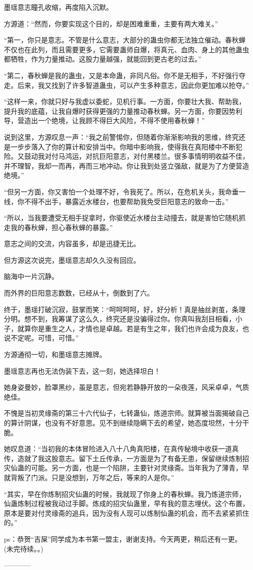 \begin{this_body}
墨瑶意志瞳孔收缩，再度陷入沉默。

方源道：“然而，你要实现这个目的，却是困难重重，主要有两大难关。”

“第一，你只是意志。不管是什么意志，大部分的蛊虫你都无法独立催动。春秋蝉不仅也在此列，而且需要更多，它需要蛊师自爆，将真元、血肉、身上的其他蛊虫都牺牲，作为力量推动。这股力量越强，就能回到更古老的过去。”

“第二，春秋蝉是我的蛊虫，又是本命蛊，非同凡俗。你不是无相手，不好强行夺走。后来，我又找到了许多智道蛊虫，可以产生多种意志，因此你更加难以抢夺。”

“这样一来，你就只好与我虚以委蛇，见机行事。一方面，你要壮大我、帮助我，提升我的底蕴，让我自爆时获得更强的力量推动春秋蝉。另一方面，你要因势利导，营造出一个绝境，让我顾不得巨大风险，不得不使用春秋蝉！”

说到这里，方源叹息一声：“我之前警惕你，但随着你渐渐影响我的思维，终究还是一步步落入了你的算计和安排当中。你暗中影响我，使得我在真阳楼中不断犯险。又鼓动我对付马鸿运，对抗巨阳意志，对付黑楼兰。很多事情明明收益不佳，并不理智，我却一而再，再而三地冲动。你让我到处竖立强敌，就是为了方便营造绝境。”

“但另一方面，你又害怕一个处理不好，令我死了。所以，在危机关头，我命垂一线，你不得不出手，暴露近水楼台，也要帮助我免受巨阳意志的致命一击。”

“所以，当我要遭受无相手捉拿时，你驱使近水楼台主动撞去，就是害怕它随机抓走我的春秋蝉，担心春秋蝉的暴露。”

意志之间的交流，内容虽多，却是迅捷无比。

但方源这次说完，墨瑶意志却久久没有回应。

脑海中一片沉静。

而外界的巨阳意志数数，已经从十，倒数到了六。

终于，墨瑶打破沉寂，鼓掌而笑：“呵呵呵呵，好，好分析！真是抽丝剥茧，条理分明。想不到，我筹谋了这么久，终究还是没骗得过你。你真叫我刮目相看，小子，就算你是重生之人，才情也是卓越。若是有生之年，我们也许会成为良友，也说不定呢。可惜，可惜。”

方源通彻一切，和墨瑶意志摊牌。

墨瑶意志再也无法伪装下去，这一刻，她选择坦白！

她身姿曼妙，脸罩黑纱，虽是意志，但宛若静静开放的一朵夜莲，风采卓卓，气质绝佳。

不愧是当初灵缘斋的第三十六代仙子，七转蛊仙，炼道宗师。就算被当面揭破自己的算计阴谋，也没有不好意思。见不到继续隐瞒下去的希望，她态度坦然，十分干脆。

她叹息道：“当初我的本体冒险进入八十八角真阳楼，在真传秘境中收获一道真传，造就了我这股意志。留下土丘传承，一方面是为了有备无患，保留继续炼制招灾仙蛊的可能。另一方面，也是一个陷阱，主要针对灵缘斋。当年我为了薄青，早就背叛了门派。只是没想到，万年之后，等来的人是你。”

“其实，早在你炼制招灾仙蛊的时候，我就现了你身上的春秋蝉。我乃炼道宗师，仙蛊炼制过程被我动过手脚。炼成的招灾仙蛊里，早有我的意志埋伏。这个布置，原本是要对付灵缘斋的追兵，因为没有人现可以炼制仙蛊的机会，而不去紧紧抓住的。”

ps：恭贺“吉屎”同学成为本书第一盟主，谢谢支持。今天两更，稍后还有一更。(未完待续。。)

------------

\end{this_body}

